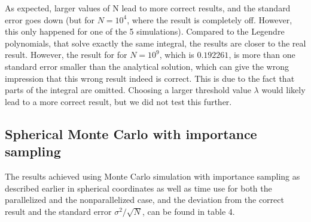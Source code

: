 \documentclass[10pt,a4paper]{article}
\begin{document}
As expected, larger values of N lead to more correct results, and the standard error goes down (but for $N=10^4$, where the result is completely off. However, this only happened for one of the 5 simulations).
Compared to the Legendre polynomials, that solve exactly the same integral, the results are closer to the real result. However, the result for for $N=10^9$, which is $0.192261$, is more than one standard error smaller than the analytical solution, which can give the wrong impression that this wrong result indeed is correct. This is due to the fact that parts of the integral are omitted. Choosing a larger threshold value $\lambda$ would likely lead to a more correct result, but we did not test this further. 
\subsection{Spherical Monte Carlo with importance sampling}
The results achieved using Monte Carlo simulation with importance sampling as described earlier in spherical coordinates as well as time use for both the parallelized and the nonparallelized case, and the deviation from the correct result and the standard error $\sigma^2/\sqrt{N}$, can be found in table 4.

\begin{comment}

\begin{table}[H]
\caption[Spherical Monte Carlo with importance sampling]{Achieved results, relative error, time-usage in seconds (averaged over 5 simulations) for both the nonparallel and the parallel program (without optimization flags) as well as standard error for Cartesian Monte Carlo with importance sampling.  The result with the median relative error is presented, the standard error is calculated from the averaged variance over 5 runs.}
\begin{tabular}{|l|l|l|l|l|l|}
\hline
N          & Result   & Relative Error & \pbox{10cm}{time {[}s{]}\\ parallelized}  &  \pbox{10cm}{time {[}s{]}\\ nonparallelized} &  \pbox{10cm}{Standard\\ Error} \\ \hline
$10^3$       & 0.220074 & 0.141665    & 0.0005288586 & 0.0004486 & 0.05248   \\\hline
$10^4$      & 0.197875 & 0.0265038   & 0.00493595   & 0.0048254 & 0.009458  \\\hline
$10^5$     & 0.195131 & 0.0122716   & 0.03278686   & 0.0480236 & 0.003511  \\\hline
$10^6$    & 0.192313 & 0.00234779  & 0.158712     & 0.4711302 & 0.001036  \\\hline
$10^7$   & 0.193096 & 0.00171425  & 1.236776     & 4.575088  & 0.0003362 \\\hline
$10^8$  & 0.192688 & 0.000403855 & 13.06474     & 42.41482  & 0.0001037 \\\hline
$10^9$ & 0.192784 & 9.70237E-05 & 141.535      & -       & 3.287$\cdot10^{-5}$\\\hline
\end{tabular}
\end{table}

\end{comment}
\end{document}
